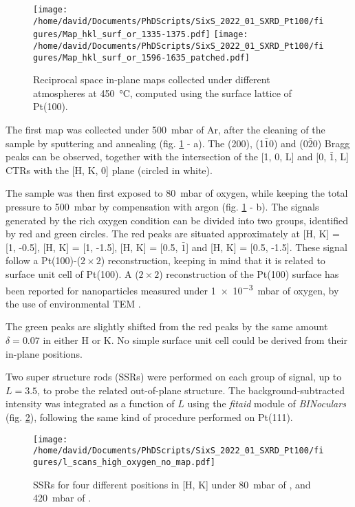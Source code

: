 \begin{figure}[!htb]
    \centering
    \texttt{[image: /home/david/Documents/PhDScripts/SixS\_2022\_01\_SXRD\_Pt100/figures/Map\_hkl\_surf\_or\_1335-1375.pdf]}
    \texttt{[image: /home/david/Documents/PhDScripts/SixS\_2022\_01\_SXRD\_Pt100/figures/Map\_hkl\_surf\_or\_1596-1635\_patched.pdf]}
    \caption{
        Reciprocal space in-plane maps collected under different atmospheres at \qty{450}{\degreeCelsius}, computed using the surface lattice of Pt(100).
    }
    \label{fig:MapsPt100A}
\end{figure}

The first map was collected under \qty{500}{\milli\bar} of Ar, after the cleaning of the sample by sputtering and annealing (fig. \ref{fig:MapsPt100A} - a).
The (200), (1$\bar{1}$0) and (0$\bar{2}$0) Bragg peaks can be observed, together with the intersection of the [1, 0, L] and [0, $\bar{1}$, L] CTRs with the [H, K, 0] plane (circled in white).

The sample was then first exposed to \qty{80}{\milli\bar} of oxygen, while keeping the total pressure to \qty{500}{\milli\bar} by compensation with argon (fig. \ref{fig:MapsPt100A} - b).
The signals generated by the rich oxygen condition can be divided into two groups, identified by red and green circles.
The red peaks are situated approximately at [H, K] = [1, -0.5], [H, K] = [1, -1.5], [H, K] = [0.5, $\bar{1}$] and [H, K] = [0.5, -1.5].
These signal follow a Pt(100)-($2\times2$) reconstruction, keeping in mind that it is related to surface unit cell of Pt(100).
A ($2\times2$) reconstruction of the Pt(100) surface has been reported for nanoparticles measured under \qty{1e-3}{\milli\bar} of oxygen, by the use of environmental TEM \parencite{Li2016}.

The green peaks are slightly shifted from the red peaks by the same amount $\delta = 0.07$ in either H or K.
No simple surface unit cell could be derived from their in-plane positions.

Two super structure rods (SSRs) were performed on each group of signal, up to $L=3.5$, to probe the related out-of-plane structure.
The background-subtracted intensity was integrated as a function of $L$ using the \textit{fitaid} module of \textit{BINoculars} (fig. \ref{fig:LScansHighOxygenPt100}), following the same kind of procedure performed on Pt(111).

\begin{figure}[!htb]
    \centering
    \texttt{[image: /home/david/Documents/PhDScripts/SixS\_2022\_01\_SXRD\_Pt100/figures/l\_scans\_high\_oxygen\_no\_map.pdf]}
    \caption{
        SSRs for four different positions in [H, K] under \qty{80}{\milli\bar} of , and \qty{420}{\milli\bar} of .
    }
    \label{fig:LScansHighOxygenPt100}
\end{figure}

